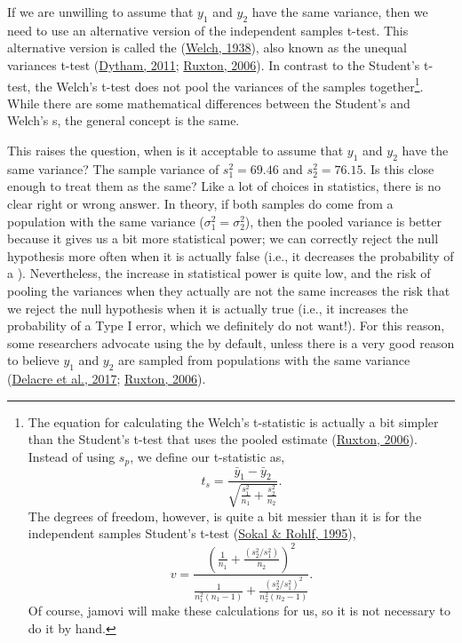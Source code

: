 \documentclass[
  openany]{krantz}
\begin{document}
If we are unwilling to assume that \(y_{1}\) and \(y_{2}\) have the same variance, then we need to use an alternative version of the independent samples t-test.
This alternative version is called the  (\protect\hyperlink{ref-Welch1938}{Welch, 1938}), also known as the unequal variances t-test (\protect\hyperlink{ref-Dytham2011}{Dytham, 2011}; \protect\hyperlink{ref-Ruxton2006}{Ruxton, 2006}).
In contrast to the Student's t-test, the Welch's t-test does not pool the variances of the samples together\footnote{The equation for calculating the Welch's t-statistic is actually a bit simpler than the Student's t-test that uses the pooled estimate (\protect\hyperlink{ref-Ruxton2006}{Ruxton, 2006}). Instead of using \(s_{p}\), we define our t-statistic as, \[t_{s} = \frac{\bar{y}_{1} - \bar{y}_{2}}{ \sqrt{ \frac{s^{2}_{1}}{n_{1}} + \frac{s^{2}_{2}}{n_{2}}} }.\] The degrees of freedom, however, is quite a bit messier than it is for the independent samples Student's t-test (\protect\hyperlink{ref-Sokal1995}{Sokal \& Rohlf, 1995}), \[v = \frac{\left(\frac{1}{n_{1}} + \frac{(s^{2}_{2} / s^{2}_{1})}{n_{2}} \right)^{2}}{\frac{1}{n^{2}_{1}\left(n_{1} - 1 \right)} + \frac{(s^{2}_{2} / s^{2}_{1})^{2}}{n^{2}_{2}\left(n_{2} - 1 \right)}}.\] Of course, jamovi will make these calculations for us, so it is not necessary to do it by hand.}.
While there are some mathematical differences between the Student's and Welch's s, the general concept is the same.

This raises the question, when is it acceptable to assume that \(y_{1}\) and \(y_{2}\) have the same variance?
The sample variance of \(s^{2}_{1} = 69.46\) and \(s^{2}_{2} = 76.15\).
Is this close enough to treat them as the same?
Like a lot of choices in statistics, there is no clear right or wrong answer.
In theory, if both samples do come from a population with the same variance (\(\sigma^{2}_{1} = \sigma^{2}_{2}\)), then the pooled variance is better because it gives us a bit more statistical power; we can correctly reject the null hypothesis more often when it is actually false (i.e., it decreases the probability of a ).
Nevertheless, the increase in statistical power is quite low, and the risk of pooling the variances when they actually are not the same increases the risk that we reject the null hypothesis when it is actually true (i.e., it increases the probability of a Type I error, which we definitely do not want!).
For this reason, some researchers advocate using the  by default, unless there is a very good reason to believe \(y_{1}\) and \(y_{2}\) are sampled from populations with the same variance (\protect\hyperlink{ref-Delacre2017}{Delacre et al., 2017}; \protect\hyperlink{ref-Ruxton2006}{Ruxton, 2006}).
\end{document}
